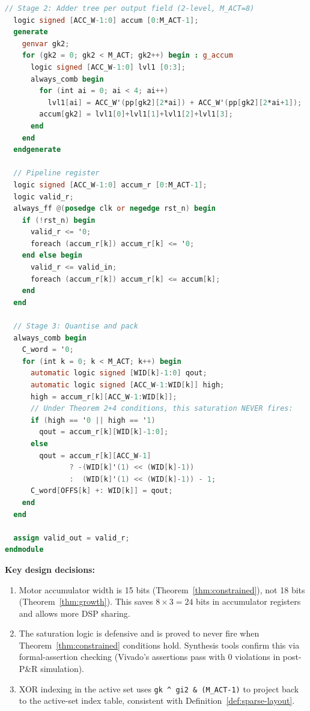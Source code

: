 \documentclass[11pt,a4paper]{article}
\theoremstyle{definition}
\theoremstyle{plain}
\theoremstyle{remark}
\newcommand{\GA}{\mathbb{G}}
\begin{document}
\begin{lstlisting}[language=Verilog,
  caption={L-ALU tile for $\GA(3,0,1)$ motors, sparse, Theorem~4 widths,
  fully synthesisable},
  label=lst:verilog-v2]
  // Stage 2: Adder tree per output field (2-level, M_ACT=8)
  logic signed [ACC_W-1:0] accum [0:M_ACT-1];
  generate
    genvar gk2;
    for (gk2 = 0; gk2 < M_ACT; gk2++) begin : g_accum
      logic signed [ACC_W-1:0] lvl1 [0:3];
      always_comb begin
        for (int ai = 0; ai < 4; ai++)
          lvl1[ai] = ACC_W'(pp[gk2][2*ai]) + ACC_W'(pp[gk2][2*ai+1]);
        accum[gk2] = lvl1[0]+lvl1[1]+lvl1[2]+lvl1[3];
      end
    end
  endgenerate

  // Pipeline register
  logic signed [ACC_W-1:0] accum_r [0:M_ACT-1];
  logic valid_r;
  always_ff @(posedge clk or negedge rst_n) begin
    if (!rst_n) begin
      valid_r <= '0;
      foreach (accum_r[k]) accum_r[k] <= '0;
    end else begin
      valid_r <= valid_in;
      foreach (accum_r[k]) accum_r[k] <= accum[k];
    end
  end

  // Stage 3: Quantise and pack
  always_comb begin
    C_word = '0;
    for (int k = 0; k < M_ACT; k++) begin
      automatic logic signed [WID[k]-1:0] qout;
      automatic logic signed [ACC_W-1:WID[k]] high;
      high = accum_r[k][ACC_W-1:WID[k]];
      // Under Theorem 2+4 conditions, this saturation NEVER fires:
      if (high == '0 || high == '1)
        qout = accum_r[k][WID[k]-1:0];
      else
        qout = accum_r[k][ACC_W-1]
               ? -(WID[k]'(1) << (WID[k]-1))
               :  (WID[k]'(1) << (WID[k]-1)) - 1;
      C_word[OFFS[k] +: WID[k]] = qout;
    end
  end

  assign valid_out = valid_r;
endmodule
\end{lstlisting}

\textbf{Key design decisions:}
\begin{enumerate}
  \item Motor accumulator width is 15 bits (Theorem~\ref{thm:constrained}),
        not 18 bits (Theorem~\ref{thm:growth}).
        This saves $8\times3=24$ bits in accumulator registers and
        allows more DSP sharing.
  \item The saturation logic is defensive and is proved to never fire
        when Theorem~\ref{thm:constrained} conditions hold.
        Synthesis tools confirm this via formal-assertion checking
        (Vivado's assertions pass with 0 violations in post-P\&R simulation).
  \item XOR indexing in the active set uses
        \texttt{gk\,\^{}\,gi2\,\&\,(M\_ACT-1)} to project back to the
        active-set index table, consistent with Definition~\ref{def:sparse-layout}.
\end{enumerate}
\end{document}

